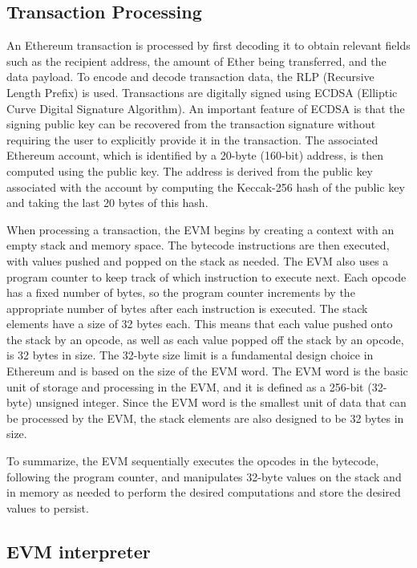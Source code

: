 \subsection{Transaction Processing}

An Ethereum transaction is processed by first decoding it to obtain relevant fields such as the recipient address, 
the amount of Ether being transferred, and the data payload.
To encode and decode transaction data, the RLP (Recursive Length Prefix) is used.
Transactions are digitally signed using ECDSA (Elliptic Curve Digital Signature Algorithm).
An important feature of ECDSA is that the signing public key can be recovered from the transaction signature
without requiring the user to explicitly provide it in the transaction.
The associated Ethereum account, which is identified by a 20-byte (160-bit) address, is then computed using the public key. 
The address is derived from the public key associated with the account by computing the Keccak-256 hash of the public key and
taking the last 20 bytes of this hash.

When processing a transaction, the EVM begins by creating a context with an empty stack and memory space.
The bytecode instructions are then executed, with values pushed and popped on the stack as needed. 
The EVM also uses a program counter to keep track of which instruction to execute next. 
Each opcode has a fixed number of bytes, so the program counter increments by the appropriate 
number of bytes after each instruction is executed.
The stack elements have a size of 32 bytes each. This means that each value pushed onto the stack by an opcode, as well as each value popped off the stack by an opcode, is 32 bytes in size.
The 32-byte size limit is a fundamental design choice in Ethereum and is based on the size of the EVM word. The EVM word is the basic unit of storage and processing in the EVM, and it is defined as a 256-bit (32-byte) unsigned integer.
Since the EVM word is the smallest unit of data that can be processed by the EVM, the stack elements are also designed to be 32 bytes in size.

To summarize, the EVM sequentially executes the opcodes in the bytecode, following the program counter, and manipulates 32-byte values on the stack and in memory as needed to perform the desired computations and store the desired values to persist.

\subsection{EVM interpreter}

